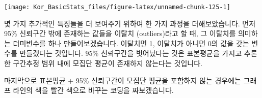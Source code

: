 \documentclass[]{book}
\newenvironment{Shaded}{\begin{snugshade}}{\end{snugshade}}
\newcommand{\DataTypeTok}[1]{\textcolor[rgb]{0.13,0.29,0.53}{#1}}
\newcommand{\DecValTok}[1]{\textcolor[rgb]{0.00,0.00,0.81}{#1}}
\newcommand{\FloatTok}[1]{\textcolor[rgb]{0.00,0.00,0.81}{#1}}
\newcommand{\KeywordTok}[1]{\textcolor[rgb]{0.13,0.29,0.53}{\textbf{#1}}}
\newcommand{\NormalTok}[1]{#1}
\newcommand{\OperatorTok}[1]{\textcolor[rgb]{0.81,0.36,0.00}{\textbf{#1}}}
\newcommand{\OtherTok}[1]{\textcolor[rgb]{0.56,0.35,0.01}{#1}}
\newcommand{\StringTok}[1]{\textcolor[rgb]{0.31,0.60,0.02}{#1}}
\begin{document}
\begin{center}\texttt{[image: Kor\_BasicStats\_files/figure-latex/unnamed-chunk-125-1]} \end{center}

몇 가지 추가적인 특징들을 더 보여주기 위하여 한 가지 과정을 더해보았습니다. 먼저 95\% 신뢰구간 밖에 존재하는 값들을 이탈치 (outliers)라고 할 때, 그 이탈치를 의미하는 더미변수를 하나 만들어보겠습니다. 이탈치면 1, 이탈치가 아니면 0의 값을 갖는 변수를 만들겠다는 것입니다. 95\% 신뢰구간을 벗어났다는 것은 표본평균을 가지고 추론한 구간추정 범위 내에 모집단 평균이 존재하지 않는다는 것입니다.

\begin{Shaded}
\end{Shaded}

마지막으로 표본평균 + 95\% 신뢰구간이 모집단 평균을 포함하지 않는 경우에는 그래프 라인의 색을 빨간 색으로 바꾸는 코딩을 짜보겠습니다.
\end{document}
